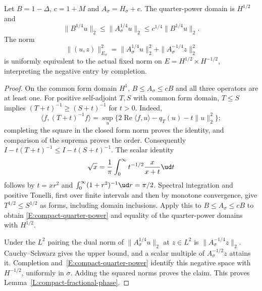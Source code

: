 \begin{lemma}\label{L:compact-fractional-phase}
  Let $B=1-\Delta$, $c=1+M$ and $A_\sigma=H_\sigma+c$.
  The quarter-power domain is $H^{1/2}$ and
  \begin{equation}\label{E:compact-quarter-power}
    \|B^{1/4}u\|_2\le\|A_\sigma^{1/4}u\|_2
    \le c^{1/4}\|B^{1/4}u\|_2.
  \end{equation}
  The norm
  \begin{equation}\label{E:compact-spectral-phase-norm}
    \|(u,z)\|_{E_\sigma}^2
    =\|A_\sigma^{1/4}u\|_2^2
    +\|A_\sigma^{-1/4}z\|_2^2
  \end{equation}
  is uniformly equivalent to the actual fixed norm on
  $E=H^{1/2}\times H^{-1/2}$, interpreting the negative entry by
  completion.
\end{lemma}

\begin{proof}
  On the common form domain $H^1$, $B\le A_\sigma\le cB$ and all
  three operators are at least one. For positive self-adjoint $T,S$
  with common form domain, $T\le S$ implies
  $(T+t)^{-1}\ge(S+t)^{-1}$ for $t>0$. Indeed,
  \[
    \langle f,(T+t)^{-1}f\rangle
    =\sup_u\{2\operatorname{Re}\langle f,u\rangle
    -q_T(u)-t\|u\|_2^2\};
  \]
  completing the square in the closed form norm proves the identity,
  and comparison of the suprema proves the order.
  Consequently $I-t(T+t)^{-1}\le I-t(S+t)^{-1}$.
  The scalar identity
  \[
    \sqrt x=\frac1\pi\int_0^\infty
    t^{-1/2}\frac{x}{x+t}\ud t
  \]
  follows by $t=xr^2$ and $\int_0^\infty(1+r^2)^{-1}\ud r=\pi/2$.
  Spectral integration and positive Tonelli, first over finite
  intervals and then by monotone convergence, give
  $T^{1/2}\le S^{1/2}$ as forms, including domain inclusions.
  Apply this to $B\le A_\sigma\le cB$ to obtain
  \eqref{E:compact-quarter-power} and equality of the quarter-power
  domains with $H^{1/2}$.

  Under the $L^2$ pairing the dual norm of
  $\|A_\sigma^{1/4}u\|_2$ at $z\in L^2$ is
  $\|A_\sigma^{-1/4}z\|_2$. Cauchy--Schwarz gives the upper bound,
  and a scalar multiple of $A_\sigma^{-1/2}z$ attains it.
  Completion and~\eqref{E:compact-quarter-power} identify this
  negative space with $H^{-1/2}$, uniformly in $\sigma$.
  Adding the squared norms proves the claim.
  This proves Lemma~\ref{L:compact-fractional-phase}.
\end{proof}

